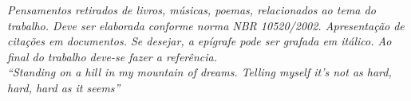 


\vspace{7.5cm}
\thispagestyle{empty}
\begin{citacaodireta}
\textit{Pensamentos retirados de livros, músicas, poemas, relacionados ao tema do trabalho.
	Deve ser elaborada conforme norma NBR 10520/2002. Apresentação de citações em documentos.
	Se desejar, a epígrafe pode ser grafada em itálico.
	Ao final do trabalho deve-se fazer a referência. 
	\\
	``Standing on a hill in my mountain of dreams. Telling myself it's not as hard, hard, hard as it seems''} \cite{musica} 
	
\end{citacaodireta}
